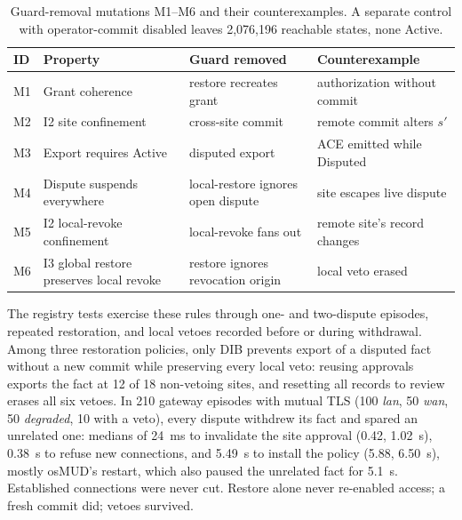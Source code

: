 \documentclass[journal]{IEEEtran}
\theoremstyle{definition}
\begin{document}
\begin{table}[t]
\centering
\caption{Guard-removal mutations M1--M6 and their counterexamples. A separate control with operator-commit disabled leaves 2,076,196 reachable states, none Active.}
\label{tab:tla}
\scriptsize
\begin{tabular}{@{}p{0.35cm}p{2.05cm}p{1.85cm}p{1.95cm}@{}}
\toprule
ID & Property & Guard removed & Counterexample \\
\midrule
M1 & Grant coherence & restore recreates grant & authorization without commit \\
M2 & I2 site confinement & cross-site commit & remote commit alters $s'$ \\
M3 & Export requires Active & disputed export & ACE emitted while Disputed \\
M4 & Dispute suspends everywhere & local-restore ignores open dispute & site escapes live dispute \\
M5 & I2 local-revoke confinement & local-revoke fans out & remote site's record changes \\
M6 & I3 global restore preserves local revoke & restore ignores revocation origin & local veto erased \\
\bottomrule
\end{tabular}
\end{table}

The registry tests exercise these rules through one- and two-dispute episodes, repeated restoration, and local vetoes recorded before or during withdrawal. Among three restoration policies, only DIB prevents export of a disputed fact without a new commit while preserving every local veto: reusing approvals exports the fact at 12 of 18 non-vetoing sites, and resetting all records to review erases all six vetoes. In 210 gateway episodes with mutual TLS (100 \emph{lan}, 50 \emph{wan}, 50 \emph{degraded}, 10 with a veto), every dispute withdrew its fact and spared an unrelated one: medians of 24~ms to invalidate the site approval (0.42, 1.02~s), 0.38~s to refuse new connections, and 5.49~s to install the policy (5.88, 6.50~s), mostly osMUD's restart, which also paused the unrelated fact for 5.1~s. Established connections were never cut. Restore alone never re-enabled access; a fresh commit did; vetoes survived.
\end{document}
